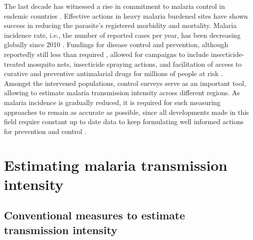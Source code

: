 The last decade has witnessed a rise in commitment to malaria control in endemic countries \cite{kitua2011conquering}.
Effective actions in heavy malaria burdened sites have shown success in reducing the parasite's registered morbidity and mortality.
Malaria incidence rate, i.e., the number of reported cases per year, has been decreasing globally since 2010 \cite{who2017world}.
Fundings for disease control and prevention, although reportedly still less than required \cite{who2017world,pigott2012funding}, allowed for campaigns to include insecticide-treated mosquito nets, insecticide spraying actions, and facilitation of access to curative and preventive antimalarial drugs for millions of people at risk \cite{who2017world}.
Amongst the intervened populations, control surveys serve as an important tool, allowing to estimate malaria transmission intensity across different regions.
As malaria incidence is gradually reduced, it is required for such measuring approaches to remain as accurate as possible, since all developments made in this field require constant up to date data to keep formulating well informed actions for prevention and control \cite{who2017framework}.
\section{Estimating malaria transmission intensity}
\label{seq:estimating}

\subsection{Conventional measures to estimate transmission intensity}

